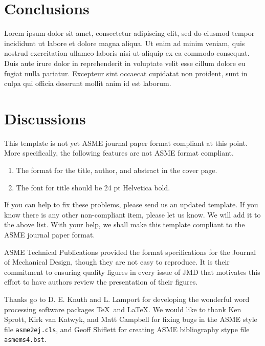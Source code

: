 \documentclass[twocolumn,10pt]{asme2ej}
\begin{document}
\section{Conclusions}
Lorem ipsum dolor sit amet, consectetur adipiscing elit, sed do eiusmod tempor incididunt ut labore et dolore magna aliqua. Ut enim ad minim veniam, quis nostrud exercitation ullamco laboris nisi ut aliquip ex ea commodo consequat. Duis aute irure dolor in reprehenderit in voluptate velit esse cillum dolore eu fugiat nulla pariatur. Excepteur sint occaecat cupidatat non proident, sunt in culpa qui officia deserunt mollit anim id est laborum.



\section{Discussions}
This template is not yet ASME journal paper format compliant at this point.
More specifically, the following features are not ASME format compliant.
\begin{enumerate}
\item
The format for the title, author, and abstract in the cover page.
\item
The font for title should be 24 pt Helvetica bold.
\end{enumerate}

\noindent
If you can help to fix these problems, please send us an updated template.
If you know there is any other non-compliant item, please let us know.
We will add it to the above list.
With your help, we shall make this template 
compliant to the ASME journal paper format.


\begin{acknowledgment}
ASME Technical Publications provided the format specifications for the Journal of Mechanical Design, though they are not easy to reproduce.  It is their commitment to ensuring quality figures in every issue of JMD that motivates this effort to have authors review the presentation of their figures.  

Thanks go to D. E. Knuth and L. Lamport for developing the wonderful word processing software packages \TeX\ and \LaTeX. We would like to thank Ken Sprott, Kirk van Katwyk, and Matt Campbell for fixing bugs in the ASME style file \verb+asme2ej.cls+, and Geoff Shiflett for creating 
ASME bibliography stype file \verb+asmems4.bst+.
\end{acknowledgment}
\end{document}
